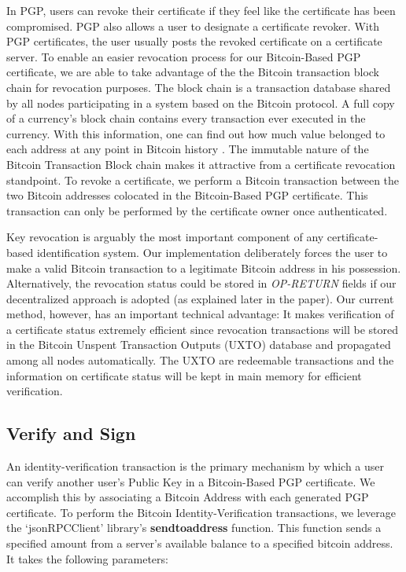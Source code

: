 \documentclass{llncs}
\begin{document}
In PGP, users can revoke their certificate if they feel like the certificate has been compromised. PGP also allows a user to designate a certificate revoker.  With PGP certificates, the user usually posts the revoked certificate on a certificate server.  To enable an easier revocation process for our Bitcoin-Based PGP certificate, we are able to take advantage of the the Bitcoin transaction block chain for revocation purposes.  The block chain is a transaction database shared by all nodes participating in a system based on the Bitcoin protocol. A full copy of a currency's block chain contains every transaction ever executed in the currency. With this information, one can find out how much value belonged to each address at any point in Bitcoin history \cite{blockchain}.  The immutable nature of the Bitcoin Transaction Block chain makes it attractive from a certificate revocation standpoint.  To revoke a certificate, we perform a Bitcoin transaction between the two Bitcoin addresses colocated in the Bitcoin-Based PGP certificate.  This transaction can only be performed by the certificate owner once authenticated. 

Key revocation is arguably the most important component of any certificate-based identification system. Our implementation deliberately forces the user to make a valid Bitcoin transaction to a legitimate Bitcoin address in his possession. Alternatively, the revocation status could be stored in \textit{OP-RETURN} fields if our decentralized approach is adopted (as explained later in the paper). 
Our current method, however, has an important technical advantage: It makes verification of a certificate status extremely efficient since revocation transactions will be stored in the Bitcoin Unspent Transaction Outputs (UXTO) database and propagated among all nodes automatically. The UXTO are redeemable transactions and the information on certificate status will be kept in main memory for efficient verification.   

\subsection{Verify and Sign}An identity-verification transaction is the primary mechanism by which a user can verify another user's Public Key in a Bitcoin-Based PGP certificate.  We accomplish this by associating a Bitcoin Address with each generated PGP certificate.  To perform the Bitcoin Identity-Verification transactions, we leverage the `jsonRPCClient' library's \textbf{sendtoaddress} function.  This function sends a specified amount from a server's available balance to a specified bitcoin address.  It takes the following parameters:\\ 
\end{document}
